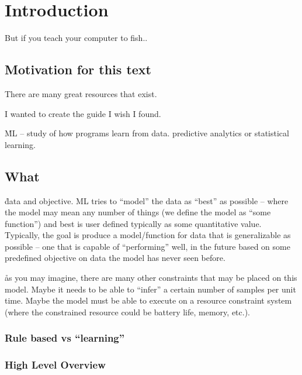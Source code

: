 \chapter{Introduction}

But if you teach your computer to fish..


\section{Motivation for this text}
There are many great resources that exist.

I wanted to create the guide I wish I found.

\r{ML -- study of how programs learn from data. predictive analytics or statistical learning.}



\section{What}

\r{data and objective. ML tries to ``model'' the data as ``best'' as possible -- where the model may mean any number of things (we define the model as ``some function'') and best is user defined typically as some quantitative value. Typically, the goal is produce a model/function for data that is generalizable as possible -- one that is capable of ``performing'' well, in the future based on some predefined objective on data the model has never seen before.}


\r{as you may imagine, there are many other constraints that may be placed on this model. Maybe it needs to be able to ``infer'' a certain number of samples per unit time. Maybe the model must be able to execute on a resource constraint system (where the constrained resource could be battery life, memory, etc.).}



\subsection{Rule based vs ``learning''}


\subsection{High Level Overview}


